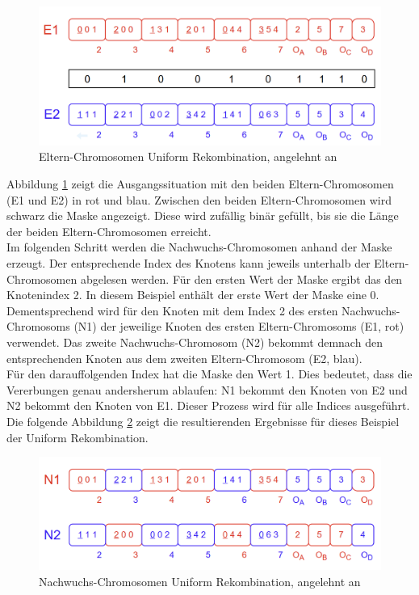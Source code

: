 \begin{figure}[H]
    \centering
    \includegraphics[scale = 0.45]{Bilder/BeispielUniformCrossover.png}
    \caption{Eltern-Chromosomen Uniform Rekombination, angelehnt an \cite{torabi_using_2022}}
    \label{fig:uniformCrossoverEltern}
\end{figure}

Abbildung \ref{fig:uniformCrossoverEltern} zeigt die Ausgangssituation mit den beiden Eltern-Chromosomen (E1 und E2) in rot und blau.
Zwischen den beiden Eltern-Chromosomen wird schwarz die Maske angezeigt.
Diese wird zufällig binär gefüllt, bis sie die Länge der beiden Eltern-Chromosomen erreicht.\\
Im folgenden Schritt werden die Nachwuchs-Chromosomen anhand der Maske erzeugt.
Der entsprechende Index des Knotens kann jeweils unterhalb der Eltern-Chromosomen abgelesen werden.
Für den ersten Wert der Maske ergibt das den Knotenindex 2.
In diesem Beispiel enthält der erste Wert der Maske eine 0.
Dementsprechend wird für den Knoten mit dem Index 2 des ersten Nachwuchs-Chromosoms (N1) der jeweilige Knoten des ersten Eltern-Chromosoms (E1, rot) verwendet.
Das zweite Nachwuchs-Chromosom (N2) bekommt demnach den entsprechenden Knoten aus dem zweiten Eltern-Chromosom (E2, blau).\\
Für den darauffolgenden Index hat die Maske den Wert 1.
Dies bedeutet, dass die Vererbungen genau andersherum ablaufen: N1 bekommt den Knoten von E2 und N2 bekommt den Knoten von E1.
Dieser Prozess wird für alle Indices ausgeführt.
Die folgende Abbildung \ref{fig:uniformCrossoverNachwuchs} zeigt die resultierenden Ergebnisse für dieses Beispiel der Uniform Rekombination.

\begin{figure}[H]
    \centering
    \includegraphics[scale = 0.45]{Bilder/BeispielUniformCrossover2.png}
    \caption{Nachwuchs-Chromosomen Uniform Rekombination, angelehnt an \cite{torabi_using_2022}}
    \label{fig:uniformCrossoverNachwuchs}
\end{figure}


